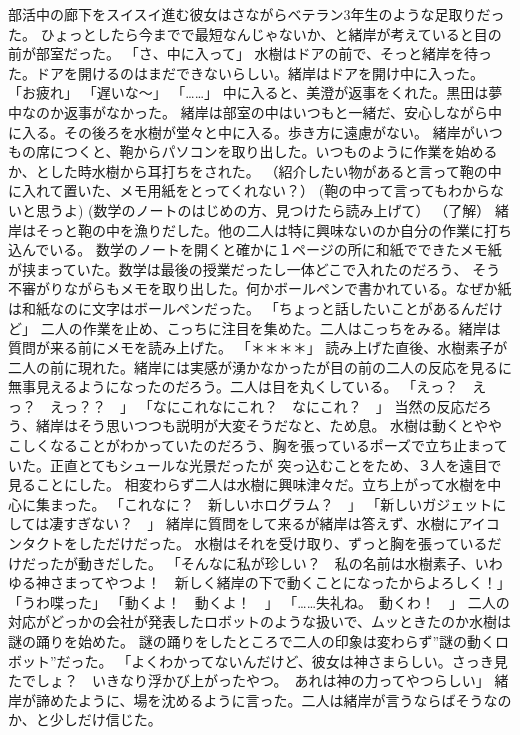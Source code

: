 \documentclass[uplatex]{utbook}
\begin{document}
部活中の廊下をスイスイ進む彼女はさながらベテラン3年生のような足取りだった。
ひょっとしたら今までで最短なんじゃないか、と緒岸が考えていると目の前が部室だった。
「さ、中に入って」
水樹はドアの前で、そっと緒岸を待った。ドアを開けるのはまだできないらしい。緒岸はドアを開け中に入った。
「お疲れ」
「遅いな〜」
「……」
中に入ると、美澄が返事をくれた。黒田は夢中なのか返事がなかった。
緒岸は部室の中はいつもと一緒だ、安心しながら中に入る。その後ろを水樹が堂々と中に入る。歩き方に遠慮がない。
緒岸がいつもの席につくと、鞄からパソコンを取り出した。いつものように作業を始めるか、とした時水樹から耳打ちをされた。
（紹介したい物があると言って鞄の中に入れて置いた、メモ用紙をとってくれない？）
(鞄の中って言ってもわからないと思うよ)
(数学のノートのはじめの方、見つけたら読み上げて）
（了解）
緒岸はそっと鞄の中を漁りだした。他の二人は特に興味ないのか自分の作業に打ち込んでいる。
数学のノートを開くと確かに１ページの所に和紙でできたメモ紙が挟まっていた。数学は最後の授業だったし一体どこで入れたのだろう、
そう不審がりながらもメモを取り出した。何かボールペンで書かれている。なぜか紙は和紙なのに文字はボールペンだった。
「ちょっと話したいことがあるんだけど」
二人の作業を止め、こっちに注目を集めた。二人はこっちをみる。緒岸は質問が来る前にメモを読み上げた。
「＊＊＊＊」
読み上げた直後、水樹素子が二人の前に現れた。緒岸には実感が湧かなかったが目の前の二人の反応を見るに
無事見えるようになったのだろう。二人は目を丸くしている。
「えっ？　えっ？　えっ？？　」
「なにこれなにこれ？　なにこれ？　」
当然の反応だろう、緒岸はそう思いつつも説明が大変そうだなと、ため息。
水樹は動くとややこしくなることがわかっていたのだろう、胸を張っているポーズで立ち止まっていた。正直とてもシュールな光景だったが
突っ込むことをため、３人を遠目で見ることにした。
相変わらず二人は水樹に興味津々だ。立ち上がって水樹を中心に集まった。
「これなに？　新しいホログラム？　」
「新しいガジェットにしては凄すぎない？　」
緒岸に質問をして来るが緒岸は答えず、水樹にアイコンタクトをしただけだった。
水樹はそれを受け取り、ずっと胸を張っているだけだったが動きだした。
「そんなに私が珍しい？　私の名前は水樹素子、いわゆる神さまってやつよ！　新しく緒岸の下で動くことになったからよろしく！」
「うわ喋った」
「動くよ！　動くよ！　」
「……失礼ね。　動くわ！　」
二人の対応がどっかの会社が発表したロボットのような扱いで、ムッときたのか水樹は謎の踊りを始めた。
謎の踊りをしたところで二人の印象は変わらず”謎の動くロボット”だった。
「よくわかってないんだけど、彼女は神さまらしい。さっき見たでしょ？　いきなり浮かび上がったやつ。　あれは神の力ってやつらしい」
緒岸が諦めたように、場を沈めるように言った。二人は緒岸が言うならばそうなのか、と少しだけ信じた。
\end{document}
